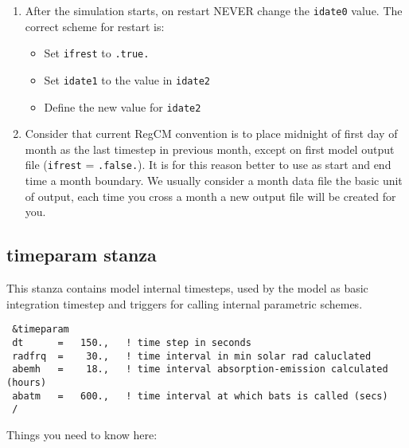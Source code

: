 \begin{enumerate}
\item After the simulation starts, on restart NEVER change the \verb=idate0=
value. The correct scheme for restart is:
\begin{itemize}
\item Set \verb=ifrest= to \verb=.true.=
\item Set \verb=idate1= to the value in \verb=idate2=
\item Define the new value for \verb=idate2=
\end{itemize}
\item Consider that current RegCM convention is to place midnight of first
day of month as the last timestep in previous month, except on first model
output file (\verb=ifrest= = \verb=.false.=). It is for this reason better
to use as start and end time a month boundary. We usually consider a month
data file the basic unit of output, each time you cross a month a new output
file will be created for you.
\end{enumerate}

\subsection{timeparam stanza}

This stanza contains model internal timesteps, used by the model as basic
integration timestep and triggers for calling internal parametric schemes.

{\footnotesize
\begin{Verbatim}
 &timeparam
 dt      =   150.,   ! time step in seconds
 radfrq  =    30.,   ! time interval in min solar rad caluclated
 abemh   =    18.,   ! time interval absorption-emission calculated (hours)
 abatm   =   600.,   ! time interval at which bats is called (secs)
 /
\end{Verbatim}
}

Things you need to know here:

